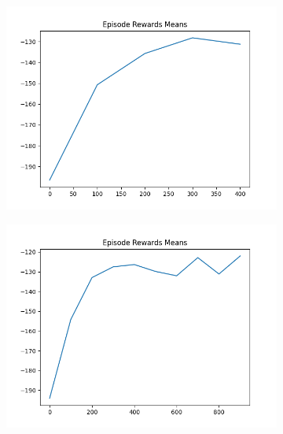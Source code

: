 \begin{figure}[H]
\begin{subfigure}{.47\linewidth}
        \includegraphics[width=\textwidth]{mountain/2024-06-15_12-35-51_dqn_mountaincar_episode_rewards_means.png}
    \end{subfigure}
    \begin{subfigure}{.47\linewidth}
        \centering
        \includegraphics[width=\textwidth]{mountain/2024-06-15_12-23-27_dqn_mountaincar_episode_rewards_means.png}
    \end{subfigure}
\end{figure}
